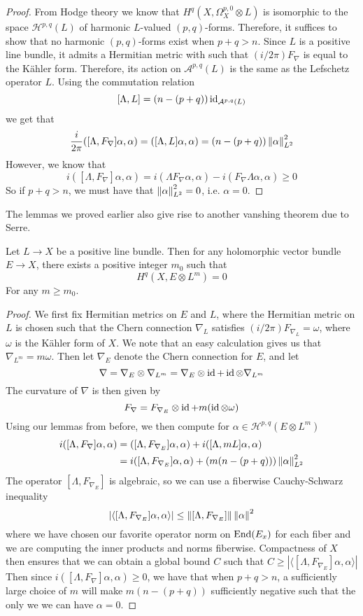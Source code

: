\begin{proof}
From Hodge theory we know that $H^q(X,\Omega_X^{p,0} \otimes L)$ is isomorphic
to the space $\mathcal{H}^{p,q}(L)$ of harmonic $L$-valued $(p,q)$-forms. Therefore,
it suffices to show that no harmonic $(p,q)$-forms exist when $p+q > n$. Since
$L$ is a positive line bundle, it admits a Hermitian metric with such that
$(i/2\pi)F_\nabla$ is equal to the K\"ahler form. Therefore, its action on
$\mathcal{A}^{p,q}(L)$ is the same as the Lefschetz operator $L$. Using the
commutation relation
\[
[\Lambda,L] = (n-(p+q))\operatorname{id}_{\mathcal{A}^{p,q}(L)}
\]
we get that
\[
\frac{i}{2\pi}([\Lambda,F_\nabla]\alpha,\alpha)
= ([\Lambda,L]\alpha,\alpha) = (n-(p+q))\left\lVert\alpha\right\rVert^2_{L^2}
\]
However, we know that
\[
i([\Lambda,F_\nabla]\alpha,\alpha) = i(\Lambda F_\nabla\alpha,\alpha)
- i(F_\nabla\Lambda\alpha,\alpha) \geq 0
\]
So if $p+q > n$, we must have that $\left\lVert\alpha\right\rVert^2_{L^2} = 0$, i.e. $\alpha = 0$.
\end{proof}
%
The lemmas we proved earlier also give rise to another vanshing theorem due to
Serre.
%
\begin{thm}
Let $L \to X$ be a positive line bundle. Then for any holomorphic vector bundle
$E \to X$, there exists a positive integer $m_0$ such that
\[
H^q(X,E \otimes L^m) = 0
\]
For any $m \geq m_0$.
\end{thm}
%
\begin{proof}
We first fix Hermitian metrics on $E$ and $L$, where the Hermitian metric on $L$ is
chosen such that the Chern connection $\nabla_L$ satisfies
$(i/2\pi)F_{\nabla_L} = \omega$, where $\omega$ is the K\"ahler form of $X$. We
note that an easy calculation gives us that $\nabla_{L^m} = m\omega$.
Then let $\nabla_E$ denote the Chern connection for $E$, and let
\[
\nabla = \nabla_E \otimes \nabla_{L^m} = \nabla_E \otimes \operatorname{id} + \operatorname{id} \otimes \nabla_{L^m}
\]
The curvature of $\nabla$ is then given by
\[
F_\nabla = F_{\nabla_E} \otimes \operatorname{id} + m(\operatorname{id} \otimes \omega)
\]
Using our lemmas from before, we then compute for
$\alpha \in \mathcal{H}^{p,q}(E \otimes L^m)$
\begin{align*}
i([\Lambda,F_\nabla]\alpha,\alpha) &= ([\Lambda,F_{\nabla_E}]\alpha,\alpha)
+ i([\Lambda,mL]\alpha,\alpha) \\
&= i([\Lambda,F_{\nabla_E}]\alpha,\alpha) + (m(n-(p+q)))\left\lVert\alpha\right\rVert^2_{L^2}
\end{align*}
The operator $[\Lambda,F_{\nabla_E}]$ is algebraic, so we can use a fiberwise
Cauchy-Schwarz inequality
\[
|\langle[\Lambda,F_{\nabla_E}]\alpha,\alpha\rangle|
\leq \left\lVert[\Lambda,F_{\nabla_E}]\right\rVert\left\lVert\alpha\right\rVert^2
\]
where we have chosen our favorite operator norm on $\operatorname{End}(E_x)$ for each fiber
and we are computing the inner products and norms fiberwise. Compactness of $X$
then ensures that we can obtain a global bound $C$ such that
$C \geq |\langle[\Lambda,F_{\nabla_E}]\alpha,\alpha\rangle|$
Then since
$i([\Lambda,F_\nabla]\alpha,\alpha) \geq 0$, we have that when $p+q > n$, a
sufficiently large choice of $m$ will make $m(n-(p+q))$ sufficiently negative
such that the only we we can have $\alpha = 0$.
\end{proof}
%
